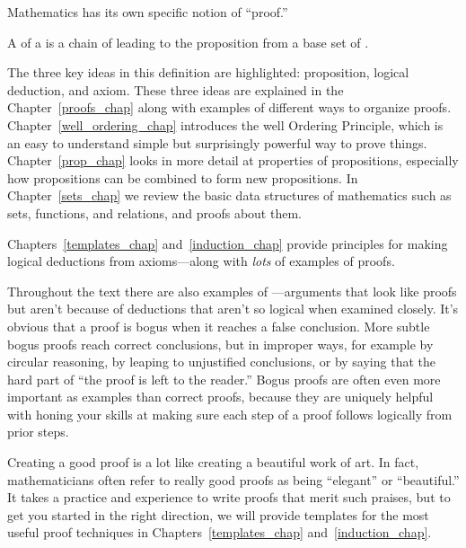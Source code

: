 Mathematics has its own specific notion of ``proof.''

\begin{definition*}
A  of a  is a chain of  leading to the proposition from a base set of .
\end{definition*}

The three key ideas in this definition are highlighted: proposition,
logical deduction, and axiom.  These three ideas are explained in the
Chapter~\ref{proofs_chap} along with examples of different ways to
organize proofs.  Chapter~\ref{well_ordering_chap} introduces the well
Ordering Principle, which is an easy to understand simple but surprisingly
powerful way to prove things.  Chapter~\ref{prop_chap} looks in more
detail at properties of propositions, especially how propositions can
be combined to form new propositions.  In Chapter~\ref{sets_chap} we
review the basic data structures of mathematics such as sets, functions,
and relations, and proofs about them.

Chapters~\ref{templates_chap}
and~\ref{induction_chap} provide principles for making logical deductions
from axioms---along with \emph{lots} of examples of proofs.

Throughout the text there are also examples of ---arguments that look like proofs but aren't because of
deductions that aren't so logical when examined closely.  It's obvious
that a proof is bogus when it reaches a false conclusion.  More subtle
bogus proofs reach correct conclusions, but in improper ways, for example
by circular reasoning, by leaping to unjustified conclusions, or by saying
that the hard part of ``the proof is left to the reader.''  Bogus proofs
are often even more important as examples than correct proofs, because
they are uniquely helpful with honing your skills at making sure each step
of a proof follows logically from prior steps.

Creating a good proof is a lot like creating a beautiful work of art.  In
fact, mathematicians often refer to really good proofs as being
``elegant'' or ``beautiful.''  It takes a practice and experience to write
proofs that merit such praises, but to get you started in the right
direction, we will provide templates for the most useful proof techniques
in Chapters~\ref{templates_chap} and~\ref{induction_chap}.  

\endinput
